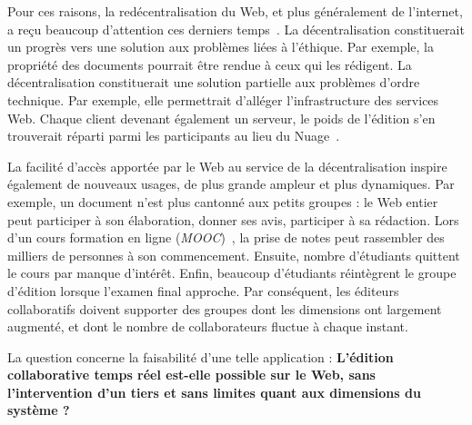 Pour ces raisons, la redécentralisation du Web, et plus généralement de
l'internet, a reçu beaucoup d'attention ces derniers temps~\cite{benet2014ipfs,
  maelstrom, mansour2016demonstration, wood2014ethereum}.  La décentralisation
constituerait un progrès vers une solution aux problèmes liées à l'éthique.  Par
exemple, la propriété des documents pourrait être rendue à ceux qui les
rédigent. La décentralisation constituerait une solution partielle aux problèmes
d'ordre technique. Par exemple, elle permettrait d'alléger l'infrastructure des
services Web. Chaque client devenant également un serveur, le poids de l'édition
s'en trouverait réparti parmi les participants au lieu du
Nuage~\cite{mell2011national}. 

La facilité d'accès apportée par le Web au service de la décentralisation
inspire également de nouveaux usages, de plus grande ampleur et plus
dynamiques. Par exemple, un document n'est plus cantonné aux petits groupes : le
Web entier peut participer à son élaboration, donner ses avis, participer à sa
rédaction. Lors d'un cours formation en ligne
(\emph{MOOC})~\cite{breslow2013studying}, la prise de notes peut rassembler des
milliers de personnes à son commencement. Ensuite, nombre d'étudiants quittent
le cours par manque d'intérêt. Enfin, beaucoup d'étudiants réintègrent le groupe
d'édition lorsque l'examen final approche.  Par conséquent, les éditeurs
collaboratifs doivent supporter des groupes dont les dimensions ont largement
augmenté, et dont le nombre de collaborateurs fluctue à chaque instant.

La question concerne la faisabilité d'une telle application :
\textbf{L'édition collaborative temps réel est-elle possible sur le Web, sans
  l'intervention d'un tiers et sans limites quant aux dimensions du système ?}

